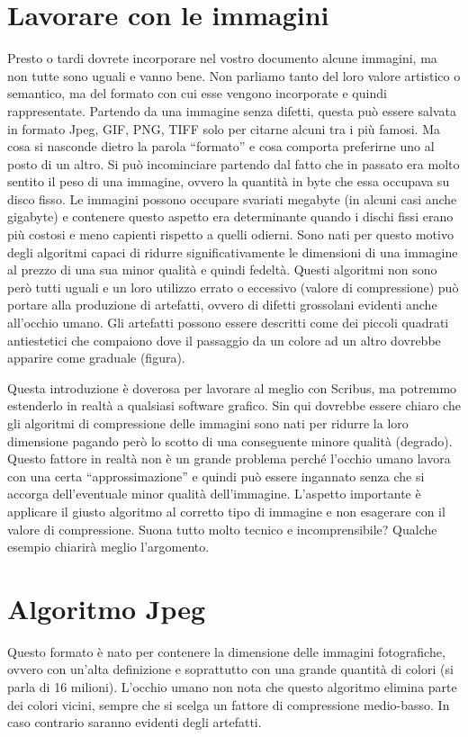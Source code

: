 \documentclass[a4paper, 12pt]{book}
\begin{document}
\section{Lavorare con le immagini}
Presto o tardi dovrete incorporare nel vostro documento alcune immagini, ma non tutte sono uguali e vanno bene. Non parliamo tanto del loro valore artistico o semantico, ma del formato con cui esse vengono incorporate e quindi rappresentate. Partendo da una immagine senza difetti, questa può essere salvata in formato Jpeg, GIF, PNG, TIFF solo per citarne alcuni tra i più famosi. Ma cosa si nasconde dietro la parola “formato” e cosa comporta preferirne uno al posto di un altro. Si può incominciare partendo dal fatto che in passato era molto sentito il peso di una immagine, ovvero la quantità in byte che essa occupava su disco fisso. Le immagini possono occupare svariati megabyte (in alcuni casi anche gigabyte) e contenere questo aspetto era determinante quando i dischi fissi erano più costosi e meno capienti rispetto a quelli odierni. Sono nati per questo motivo degli algoritmi capaci di ridurre significativamente le dimensioni di una immagine al prezzo di una sua minor qualità e quindi fedeltà. Questi algoritmi non sono però tutti uguali e un loro utilizzo errato o eccessivo (valore di compressione) può portare alla produzione di artefatti, ovvero di difetti grossolani evidenti anche all'occhio umano. Gli artefatti possono essere descritti come dei piccoli quadrati antiestetici che compaiono dove il passaggio da un colore ad un altro dovrebbe apparire come graduale (figura).

Questa introduzione è doverosa per lavorare al meglio con Scribus, ma potremmo estenderlo in realtà a qualsiasi software grafico. Sin qui dovrebbe essere chiaro che gli algoritmi di compressione delle immagini sono nati per ridurre la loro dimensione pagando però lo scotto di una conseguente minore qualità (degrado). Questo fattore in realtà non è un grande problema perché l'occhio umano lavora con una certa “approssimazione” e quindi può essere ingannato senza che si accorga dell'eventuale minor qualità dell'immagine. L'aspetto importante è applicare il giusto algoritmo al corretto tipo di immagine e non esagerare con il valore di compressione. Suona tutto molto tecnico e incomprensibile? Qualche esempio chiarirà meglio l'argomento.

\section{Algoritmo Jpeg}
Questo formato è nato per contenere la dimensione delle immagini fotografiche, ovvero con un'alta definizione e soprattutto con una grande quantità di colori (si parla di 16 milioni). L'occhio umano non nota che questo algoritmo elimina parte dei colori vicini, sempre che si scelga un fattore di compressione medio-basso. In caso contrario saranno evidenti degli artefatti.
\end{document}
